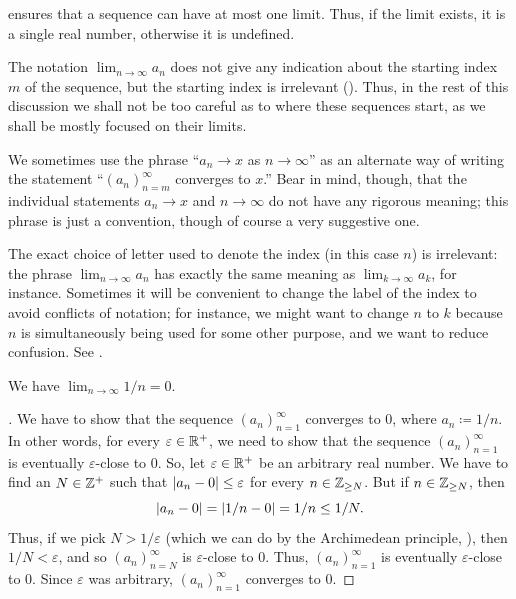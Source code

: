 \begin{note}
   ensures that a sequence can have at most one limit.
  Thus, if the limit exists, it is a single real number, otherwise it is undefined.
\end{note}

\begin{rmk}\label{i:6.1.9}
  The notation \(\lim_{n \to \infty} a_n\) does not give any indication about the starting index \(m\) of the sequence, but the starting index is irrelevant ().
  Thus, in the rest of this discussion we shall not be too careful as to where these sequences start, as we shall be mostly focused on their limits.
\end{rmk}

\begin{note}
  We sometimes use the phrase ``\(a_n \to x\) as \(n \to \infty\)'' as an alternate way of writing the statement ``\((a_n)_{n = m}^\infty\) converges to \(x\).''
  Bear in mind, though, that the individual statements \(a_n \to x\) and \(n \to \infty\) do not have any rigorous meaning;
  this phrase is just a convention, though of course a very suggestive one.
\end{note}

\begin{rmk}\label{i:6.1.10}
  The exact choice of letter used to denote the index (in this case \(n\)) is irrelevant:
  the phrase \(\lim_{n \to \infty} a_n\) has exactly the same meaning as \(\lim_{k \to \infty} a_k\), for instance.
  Sometimes it will be convenient to change the label of the index to avoid conflicts of notation;
  for instance, we might want to change \(n\) to \(k\) because \(n\) is simultaneously being used for some other purpose, and we want to reduce confusion.
  See .
\end{rmk}

\begin{prop}\label{i:6.1.11}
  We have \(\lim_{n \to \infty} 1 / n = 0\).
\end{prop}

\begin{proof}[]
  We have to show that the sequence \((a_n)_{n = 1}^\infty\) converges to \(0\), where \(a_n \coloneqq 1 / n\).
  In other words, for every \(\varepsilon \in \mathbb{R}^+\), we need to show that the sequence \((a_n)_{n = 1}^\infty\) is eventually \(\varepsilon\)-close to \(0\).
  So, let \(\varepsilon \in \mathbb{R}^+\) be an arbitrary real number.
  We have to find an \(N \in \mathbb{Z}^+\) such that \(\left\lvert a_n - 0\right\rvert \leq \varepsilon\) for every \(n \in \mathbb{Z}_{\geq N}\).
  But if \(n \in \mathbb{Z}_{\geq N}\), then
  \[
    \left\lvert a_n - 0\right\rvert = \left\lvert1 / n - 0\right\rvert = 1 / n \leq 1 / N.
  \]
  Thus, if we pick \(N > 1 / \varepsilon\) (which we can do by the Archimedean principle, ), then \(1 / N < \varepsilon\), and so \((a_n)_{n = N}^\infty\) is \(\varepsilon\)-close to \(0\).
  Thus, \((a_n)_{n = 1}^\infty\) is eventually \(\varepsilon\)-close to \(0\).
  Since \(\varepsilon\) was arbitrary, \((a_n)_{n = 1}^\infty\) converges to \(0\).
\end{proof}

